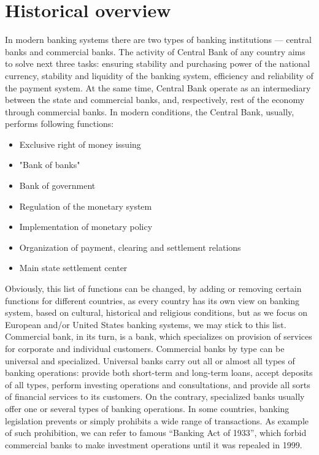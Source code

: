 
\section{Historical overview}

In modern banking systems there are two types of banking institutions — central banks and commercial banks. 
The activity of Central Bank of any country aims to solve next three tasks: ensuring stability and purchasing power of the national currency, stability and liquidity of the banking system, efficiency and reliability of the payment system. 
At the same time, Central Bank operate as an intermediary between the state and commercial banks, and, respectively, rest of the economy through commercial banks.
In modern conditions, the Central Bank, usually, performs following functions:

\begin{itemize}
    \item Exclusive right of money issuing
    \item "Bank of banks"
    \item Bank of government
    \item Regulation of the monetary system
    \item Implementation of monetary policy
    \item Organization of payment, clearing and settlement relations
    \item Main state settlement center
\end{itemize}

Obviously, this list of functions can be changed, by adding or removing certain functions for different countries, as every country has its own view on banking system, based on cultural, historical and religious conditions, but as we focus on European and/or United States banking systems, we may stick to this list. 
Commercial bank, in its turn, is a bank, which specializes on provision of services for corporate and individual customers. Commercial banks by type can be universal and specialized. Universal banks carry out all or almost all types of banking operations: provide both short-term and long-term loans, accept deposits of all types, perform investing operations and consultations, and provide all sorts of financial services to its customers.
On the contrary, specialized banks usually offer one or several types of banking operations. In some countries, banking legislation prevents or simply prohibits a wide range of transactions. As example of such prohibition, we can refer to famous “Banking Act of 1933”, which forbid commercial banks to make investment operations until it was repealed in 1999.

